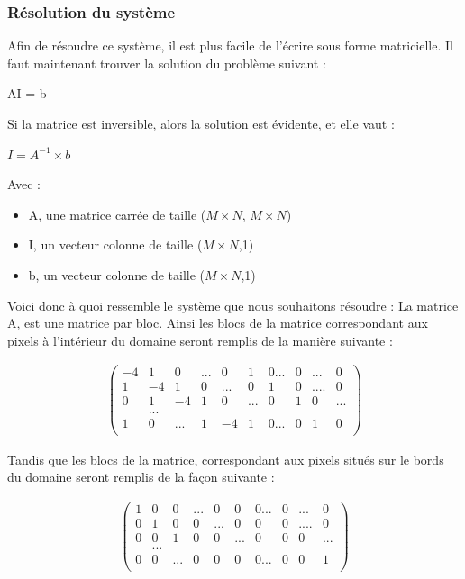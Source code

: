 \subsubsection{Résolution du système}
Afin de résoudre ce système, il est plus facile de l'écrire sous forme matricielle. Il faut maintenant trouver la solution du problème suivant : 
\begin{center}
 AI = b 
\end{center}
Si la matrice est inversible, alors la solution est évidente, et elle vaut : 
\begin{center}
$I = A^{-1}\times b$
\end{center} 
Avec : 
\begin{itemize}
\item A, une matrice carrée de taille ($M\times N$, $M\times N$)
\item I, un vecteur colonne de taille ($M\times N$,1)
\item b, un vecteur colonne de taille ($M\times N$,1)
\end{itemize}
Voici donc à quoi ressemble le système que nous souhaitons résoudre :
La matrice A, est une matrice par bloc. Ainsi les blocs de la matrice correspondant aux pixels à l'intérieur du domaine seront remplis de la manière  suivante : 
\begin{center}
\begin{equation}
\left.
\begin{aligned}
\begin{pmatrix}
	-4 & 1 & 0 & ...& 0 & 1 & 0...&0& ... & 0\\
	1 & -4 & 1 & 0 & ... & 0 &1 &0&....&0\\
	0 & 1 & -4 & 1 & 0&... &0 &1 &0&...\\
	&...\\
	1 & 0 &... &1 &-4 &1 &0...& 0& 1 & 0\\
\end{pmatrix}
\end{aligned}
\right.
\end{equation}
\end{center}
Tandis que les blocs de la matrice, correspondant aux pixels situés sur le bords du domaine seront remplis de la façon suivante : 
\begin{center}
\begin{equation}
\left.
\begin{aligned}
\begin{pmatrix}
	1 & 0& 0 & ...& 0 & 0 & 0...&0& ... & 0\\
	0 & 1 & 0 & 0 & ... & 0 &0 &0&....&0\\
	0 & 0 & 1 & 0 & 0&... &0 &0 &0&...\\
	&...\\
	0 & 0 &... &0 &0 &0 &0...& 0& 0 & 1\\
\end{pmatrix}
\end{aligned}
\right.
\end{equation}
\end{center}

